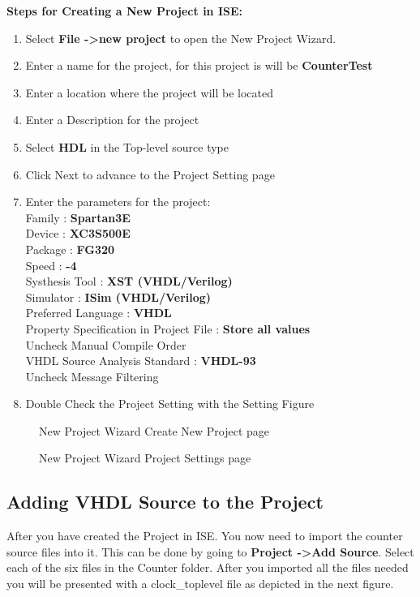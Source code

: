\documentclass{article}
\begin{document}
\textbf{Steps for Creating a New Project in ISE:}
\begin{enumerate}
  \item Select \textbf{File -\textgreater new project} to open the New Project Wizard.
  \item Enter a name for the project, for this project is will be \textbf{CounterTest}
  \item Enter a location where the project will be located
  \item Enter a Description for the project
  \item Select \textbf{HDL} in the Top-level source type
  \item Click Next to advance to the Project Setting page
  \item Enter the parameters for the project: \hfill \\
  Family : \textbf{Spartan3E}\\
  Device : \textbf{XC3S500E}\\
  Package : \textbf{FG320}\\
  Speed  : \textbf{-4}\\
  Systhesis Tool : \textbf{XST (VHDL/Verilog)}\\
  Simulator : \textbf{ISim (VHDL/Verilog)}\\
  Preferred Language : \textbf{VHDL}\\
  Property Specification in Project File : \textbf{Store all values}\\
  Uncheck Manual Compile Order\\
  VHDL Source Analysis Standard : \textbf{VHDL-93}\\
  Uncheck Message Filtering
  \item Double Check the Project Setting with the Setting Figure
\end{enumerate}

\newpage %

\begin{figure}[!htb]
  \centering
  \caption{New Project Wizard Create New Project page}
\end{figure}

\begin{figure}[!htb]
  \centering
  \caption{New Project Wizard Project Settings page}
\end{figure}

\subsection{Adding VHDL Source to the Project}
After you have created the Project in ISE. You now need to import the counter source files into it. This can be done by going to \textbf{Project -\textgreater Add Source}. Select each of the six files in the Counter folder. After you imported all the files needed you will be presented with a clock\_toplevel file as depicted in the next figure.
\end{document}
